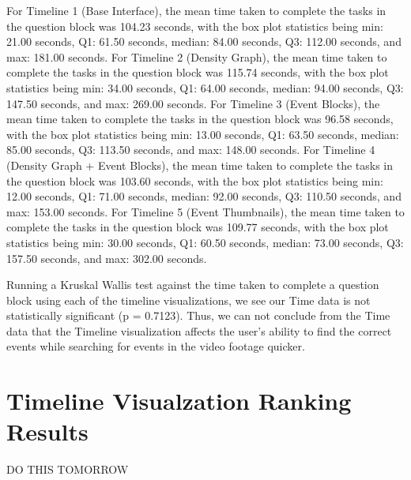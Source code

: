 \documentclass[doublespace,draft,nopageskip]{VTthesis} %
\begin{document}
For Timeline 1 (Base Interface), the mean time taken to complete the tasks in the question block was 104.23 seconds, with the box plot statistics being min: 21.00 seconds, Q1: 61.50 seconds, median: 84.00 seconds, Q3: 112.00 seconds, and max: 181.00 seconds. For Timeline 2 (Density Graph), the mean time taken to complete the tasks in the question block was 115.74 seconds, with the box plot statistics being min: 34.00 seconds, Q1: 64.00 seconds, median: 94.00 seconds, Q3: 147.50 seconds, and max: 269.00 seconds. For Timeline 3 (Event Blocks), the mean time taken to complete the tasks in the question block was 96.58 seconds, with the box plot statistics being min: 13.00 seconds, Q1: 63.50 seconds, median: 85.00 seconds, Q3: 113.50 seconds, and max: 148.00 seconds. For Timeline 4 (Density Graph + Event Blocks), the mean time taken to complete the tasks in the question block was 103.60 seconds, with the box plot statistics being min: 12.00 seconds, Q1: 71.00 seconds, median: 92.00 seconds, Q3: 110.50 seconds, and max: 153.00 seconds. For Timeline 5 (Event Thumbnails), the mean time taken to complete the tasks in the question block was 109.77 seconds, with the box plot statistics being min: 30.00 seconds, Q1: 60.50 seconds, median: 73.00 seconds, Q3: 157.50 seconds, and max: 302.00 seconds.

Running a Kruskal Wallis test against the time taken to complete a question block using each of the timeline visualizations, we see our Time data is not statistically significant (p = 0.7123). Thus, we can not conclude from the Time data that the Timeline visualization affects the user's ability to find the correct events while searching for events in the video footage quicker.

\section{Timeline Visualzation Ranking Results}
DO THIS TOMORROW
\end{document}
